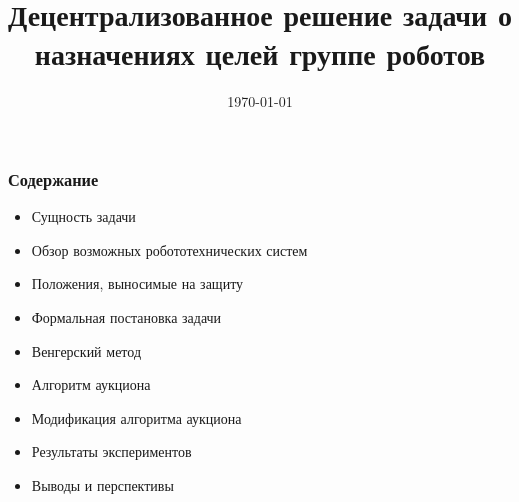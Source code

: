 \documentclass{beamer}
\title{Децентрализованное решение задачи о назначениях целей группе роботов}
\author{}
\date{\today}
\begin{document}
	
	\begin{frame}[plain]
		\titlepage
	\end{frame}

	\begin{frame}
		\frametitle{Содержание}
		\begin{itemize}
			\item Сущность задачи
			\item Обзор возможных робототехнических систем
			\item Положения, выносимые на защиту
			\item Формальная постановка задачи
			\item Венгерский метод
			\item Алгоритм аукциона
			\item Модификация алгоритма аукциона
			\item Результаты экспериментов
			\item Выводы и перспективы
		\end{itemize}
	\end{frame}
	
\end{document}
